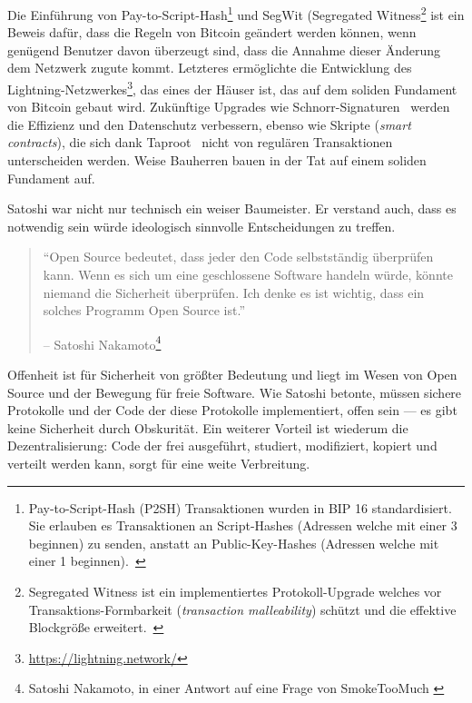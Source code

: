 Die Einführung von Pay-to-Script-Hash\footnote{Pay-to-Script-Hash (P2SH)
Transaktionen wurden in BIP 16 standardisiert. Sie erlauben es Transaktionen an
Script-Hashes (Adressen welche mit einer 3 beginnen) zu senden, anstatt an
Public-Key-Hashes (Adressen welche mit einer 1 beginnen).~\cite{btcwiki:p2sh}}
und SegWit (Segregated Witness\footnote{Segregated Witness  ist ein
implementiertes Protokoll-Upgrade welches vor Transaktions-Formbarkeit
(\textit{transaction malleability}) schützt und die effektive Blockgröße
erweitert.~\cite{btcwiki:segwit}} ist ein Beweis dafür, dass die Regeln von
Bitcoin geändert werden können, wenn genügend Benutzer davon überzeugt sind,
dass die Annahme dieser Änderung dem Netzwerk zugute kommt. Letzteres
ermöglichte die Entwicklung des
Lightning-Netzwerkes\footnote{\url{https://lightning.network/}}, das eines der
Häuser ist, das auf dem soliden Fundament von Bitcoin gebaut wird. Zukünftige
Upgrades wie Schnorr-Signaturen~\cite{bip:schnorr} werden die Effizienz und den
Datenschutz verbessern, ebenso wie Skripte (\textit{smart contracts}), die sich
dank Taproot~\cite{taproot} nicht von regulären Transaktionen unterscheiden
werden. Weise Bauherren bauen in der Tat auf einem soliden Fundament auf.

Satoshi war nicht nur technisch ein weiser Baumeister. Er verstand auch, dass es
notwendig sein würde ideologisch sinnvolle Entscheidungen zu treffen.

\begin{quotation}\begin{samepage}
\enquote{Open Source bedeutet, dass jeder den Code selbstständig überprüfen
kann. Wenn es sich um eine geschlossene Software handeln würde, könnte niemand
die Sicherheit überprüfen. Ich denke es ist wichtig, dass ein solches Programm
Open Source ist.}
\begin{flushright} -- Satoshi Nakamoto\footnote{Satoshi Nakamoto, in einer
Antwort auf eine Frage von SmokeTooMuch \cite{satoshi-open-source}}
\end{flushright}\end{samepage}\end{quotation}

Offenheit ist für Sicherheit von größter Bedeutung und liegt im Wesen von Open
Source und der Bewegung für freie Software. Wie Satoshi betonte, müssen sichere
Protokolle und der Code der diese Protokolle implementiert, offen sein --- es
gibt keine Sicherheit durch Obskurität. Ein weiterer Vorteil ist wiederum die
Dezentralisierung: Code der frei ausgeführt, studiert, modifiziert, kopiert und
verteilt werden kann, sorgt für eine weite Verbreitung.

